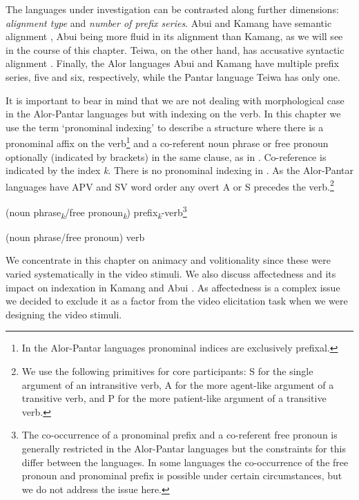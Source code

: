 The languages under investigation can be contrasted along further dimensions: \textit{alignment type} and \textit{number of prefix series}. Abui  and Kamang  have semantic alignment , Abui being more fluid in its alignment than Kamang, as we will see in the course of this chapter. Teiwa, on the other hand, has accusative syntactic alignment . Finally, the Alor languages Abui and Kamang have multiple prefix series, five and six, respectively, while the Pantar language Teiwa has only one.

It is important to bear in mind that we are not dealing with morphological case in the Alor-Pantar languages but with indexing on the verb. In this chapter we use the term `pronominal indexing'  to describe a structure where there is a pronominal affix on the verb\footnote{In the Alor-Pantar languages pronominal indices are exclusively prefixal.} and a co-referent noun phrase or free pronoun  optionally (indicated by brackets) in the same clause, as in . Co-reference is indicated by the index \textit{k}. There is no pronominal indexing in . As the Alor-Pantar languages have APV and SV word order any overt A or S precedes the verb.\footnote{We use the following primitives for core participants: S for the single argument of an intransitive verb, A for the more agent-like argument of a transitive verb, and P for the more patient-like argument of a transitive verb.} 

\ea%
\label{bkm:Ref306281876} 
    (noun phrase\textit{\textsubscript{k}}/free pronoun\textit{\textsubscript{k}})    prefix\textit{\textsubscript{k}}{}-verb\footnote{The co-occurrence of a pronominal prefix and a co-referent free pronoun is generally restricted in the Alor-Pantar languages but the constraints for this differ between the languages. In some languages the co-occurrence of the free pronoun and pronominal prefix is possible under certain circumstances, but we do not address the issue here.}
\z


\ea%
\label{bkm:Ref306281880}
(noun phrase/free pronoun)    verb 
\z

    

We concentrate in this chapter on animacy  and volitionality  since these were varied systematically in the video stimuli. We also discuss affectedness  and its impact on indexation in Kamang  and Abui . As affectedness is a complex issue \citep{Tsunoda1985,Beavers2011} we decided to exclude it as a factor from the video elicitation task when we were designing the video stimuli. 


